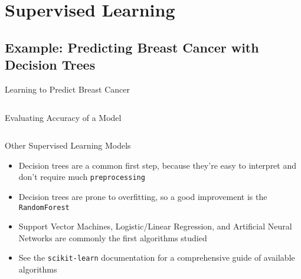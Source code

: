 \documentclass{lug}
\begin{document}
\section{Supervised Learning}
\subsection{Example: Predicting Breast Cancer with Decision Trees}
\begin{frame}{Learning to Predict Breast Cancer}
\inputminted{python3}{examples/cancer-dt.py}
\end{frame}

\begin{frame}{Evaluating Accuracy of a Model}
\inputminted{python3}{examples/cancer-dt2.py}
\end{frame}

\begin{frame}{Other Supervised Learning Models}
  \begin{itemize}[<+->]
    \item Decision trees are a common first step, because they're easy to interpret and don't require much \texttt{preprocessing}
    \item Decision trees are prone to overfitting, so a good improvement is the \texttt{RandomForest}
    \item Support Vector Machines, Logistic/Linear Regression, and Artificial Neural Networks are commonly the first algorithms studied
    \item See the \texttt{scikit-learn} documentation for a comprehensive guide of available algorithms
  \end{itemize}
\end{frame}

%
\end{document}
